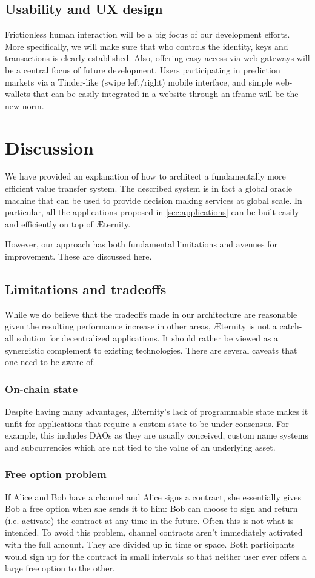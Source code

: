 \documentclass[a4paper, 10pt, conference]{ieeeconf}      %
\begin{document}
\begin{draft}
\subsection{Usability and UX design}
Frictionless human interaction will be a big focus of our development efforts. More specifically, we will make sure that who controls the identity, keys and transactions is clearly established. Also, offering easy access via web-gateways will be a central focus of future development. Users participating in prediction markets via a Tinder-like (swipe left/right) mobile interface, and simple web-wallets that can be easily integrated in a website through an iframe will be the new norm.

\section{Discussion}
We have provided an explanation of how to architect a fundamentally more efficient value transfer system. The described system is in fact a global oracle machine that can be used to provide decision making services at global scale. In particular, all the applications proposed in \cref{sec:applications} can be built easily and efficiently on top of Æternity.

However, our approach has both fundamental limitations and avenues for improvement. These are discussed here. 

\subsection{Limitations and tradeoffs}
While we do believe that the tradeoffs made in our architecture are reasonable given the resulting performance increase in other areas, Æternity is not a catch-all solution for decentralized applications. It should rather be viewed as a synergistic complement to existing technologies. There are several caveats that one need to be aware of.

\subsubsection{On-chain state}
Despite having many advantages, Æternity's lack of programmable state makes it unfit for applications that require a custom state to be under consensus. For example, this includes DAOs as they are usually conceived, custom name systems and subcurrencies which are not tied to the value of an underlying asset.

\subsubsection{Free option problem}
If Alice and Bob have a channel and Alice signs a contract, she essentially gives Bob a free option when she sends it to him: Bob can choose to sign and return (i.e. activate) the contract at any time in the future. Often this is not what is intended. To avoid this problem, channel contracts aren't immediately activated with the full amount. They are divided up in time or space. Both participants would sign up for the contract in small intervals so that neither user ever offers a large free option to the other.


\end{draft}
\end{document}
